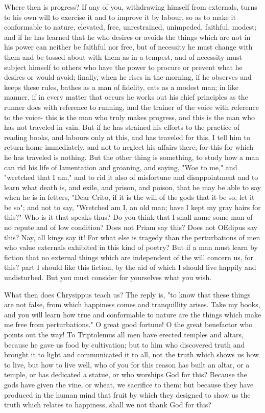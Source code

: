 \documentclass[a4paper]{article}
\begin{document}
Where then is progress? If any of you, withdrawing himself from externals,
turns to his own will to exercise it and to improve it by labour,
so as to make it conformable to nature, elevated, free, unrestrained,
unimpeded, faithful, modest; and if he has learned that he who desires
or avoids the things which are not in his power can neither be faithful
nor free, but of necessity he must change with them and be tossed
about with them as in a tempest, and of necessity must subject himself
to others who have the power to procure or prevent what he desires
or would avoid; finally, when he rises in the morning, if he observes
and keeps these rules, bathes as a man of fidelity, eats as a modest
man; in like manner, if in every matter that occurs he works out his
chief principles as the runner does with reference to running, and
the trainer of the voice with reference to the voice- this is the
man who truly makes progress, and this is the man who has not traveled
in vain. But if he has strained his efforts to the practice of reading
books, and labours only at this, and has traveled for this, I tell
him to return home immediately, and not to neglect his affairs there;
for this for which he has traveled is nothing. But the other thing
is something, to study how a man can rid his life of lamentation and
groaning, and saying, "Woe to me," and "wretched that I am," and to
rid it also of misfortune and disappointment and to learn what death
is, and exile, and prison, and poison, that he may be able to say
when he is in fetters, "Dear Crito, if it is the will of the gods
that it be so, let it be so"; and not to say, "Wretched am I, an old
man; have I kept my gray hairs for this?" Who is it that speaks thus?
Do you think that I shall name some man of no repute and of low condition?
Does not Priam say this? Does not OEdipus say this? Nay, all kings
say it! For what else is tragedy than the perturbations of men who
value externals exhibited in this kind of poetry? But if a man must
learn by fiction that no external things which are independent of
the will concern us, for this? part I should like this fiction, by
the aid of which I should live happily and undisturbed. But you must
consider for yourselves what you wish. 

What then does Chrysippus teach us? The reply is, "to know that these
things are not false, from which happiness comes and tranquillity
arises. Take my books, and you will learn how true and conformable
to nature are the things which make me free from perturbations." O
great good fortune! O the great benefactor who points out the way!
To Triptolemus all men have erected temples and altars, because he
gave us food by cultivation; but to him who discovered truth and brought
it to light and communicated it to all, not the truth which shows
us how to live, but how to live well, who of you for this reason has
built an altar, or a temple, or has dedicated a statue, or who worships
God for this? Because the gods have given the vine, or wheat, we sacrifice
to them: but because they have produced in the human mind that fruit
by which they designed to show us the truth which relates to happiness,
shall we not thank God for this? 
\end{document}

